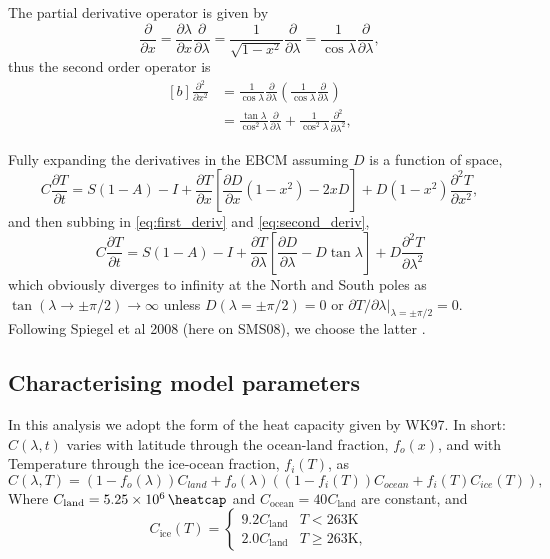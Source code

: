 \documentclass[12pt, onecolumn]{revtex4-2}    %
\begin{document}
The partial derivative operator is given by
\begin{equation}
    \frac{\partial}{\partial x} = \frac{\partial \lambda}{\partial x} \frac {\partial} {\partial \lambda}
    = \frac{1}{\sqrt{1-x^2}} \frac {\partial} {\partial \lambda}
    = \frac{1}{\cos \lambda} \frac {\partial} {\partial \lambda},
    \label{eq:first_deriv}
\end{equation}
thus the second order operator is
\begin{equation}
    \begin{aligned}[b]
        \frac{\partial^2}{\partial x^2} & = \frac{1}{\cos\lambda} \frac{\partial}{\partial \lambda} \left( \frac{1}{\cos\lambda} \frac{\partial}{\partial \lambda} \right)      \\
                                        & = \frac{\tan\lambda}{\cos^2\lambda}\frac{\partial}{\partial \lambda} + \frac{1}{\cos^2\lambda} \frac{\partial^2}{\partial \lambda^2},
    \end{aligned}
    \label{eq:second_deriv}
\end{equation}

Fully expanding the derivatives in the EBCM assuming $D$ is a function of space,
\begin{equation}
    C \frac{\partial T}{\partial t} = S(1-A) - I
    + \frac{\partial T}{\partial x}\left[\frac{\partial D}{\partial x}(1-x^2) - 2 x D\right]
    + D (1-x^2) \frac{\partial^2 T}{\partial x^2},
    \label{eq:expanded}
\end{equation}
and then subbing in \eqref{eq:first_deriv} and \eqref{eq:second_deriv},
\begin{equation}
    C \frac{\partial T}{\partial t} = S(1-A) - I
    + \frac{\partial T}{\partial \lambda}\left[\frac{\partial D}{\partial \lambda} - D \tan\lambda\right]
    + D \frac{\partial^2 T}{\partial \lambda^2}
    \label{eq:PDE_in_lat}
\end{equation}
which obviously diverges to infinity at the North and South poles as $\tan(\lambda \rightarrow \pm \pi/2) \rightarrow \infty$ unless $D(\lambda = \pm \pi/2) = 0$ or $\partial T / \partial \lambda|_{\lambda=\pm \pi/2} = 0$.
Following Spiegel et al 2008 (here on SMS08), we choose the latter \cite{SMS08}.

\subsection{Characterising model parameters} \label{sec:model_params}

In this analysis we adopt the form of the heat capacity given by WK97.
In short: $C(\lambda, t)$ varies with latitude through the ocean-land fraction, $f_o(x)$, and with Temperature through the ice-ocean fraction, $f_i(T)$, as
$$
    C(\lambda, T) = (1 - f_o(\lambda)) C_{land} + f_o(\lambda) ((1-f_i(T)) C_{ocean} + f_i(T) C_{ice}(T)),
$$
Where $C_{\text{land}} = \qty{5.25e6}{\heatcap}$ and $C_{\text{ocean}} = 40 C_{\text{land}}$ are constant, and
$$
    C_{\text{ice}}(T) =
    \begin{cases}
        9.2 C_\text{land} & T < 263\text{K}    \\
        2.0 C_\text{land} & T \ge 263\text{K},
    \end{cases}
$$
\end{document}
